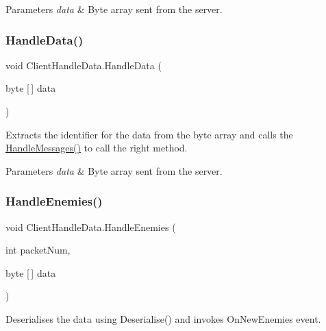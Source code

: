 \begin{DoxyParams}{Parameters}
{\em data} & Byte array sent from the server.\\
\hline
\end{DoxyParams}
\mbox{\label{class_client_handle_data_a42e1bc45eb24e69881b07c1c128252fc}} 
\subsubsection{\texorpdfstring{HandleData()}{HandleData()}}
{\footnotesize\ttfamily void Client\+Handle\+Data.\+Handle\+Data (\begin{DoxyParamCaption}\item[{byte \mbox{[}$\,$\mbox{]}}]{data }\end{DoxyParamCaption})}



Extracts the identifier for the data from the byte array and calls the \mbox{\hyperlink{class_client_handle_data_a2b973713df73e2e1bd53c70557fdcd34}{Handle\+Messages()}} to call the right method. 


\begin{DoxyParams}{Parameters}
{\em data} & Byte array sent from the server.\\
\hline
\end{DoxyParams}
\mbox{\label{class_client_handle_data_a82bf56e38f140f42f31cc54b77e6719a}} 
\subsubsection{\texorpdfstring{HandleEnemies()}{HandleEnemies()}}
{\footnotesize\ttfamily void Client\+Handle\+Data.\+Handle\+Enemies (\begin{DoxyParamCaption}\item[{int}]{packet\+Num,  }\item[{byte \mbox{[}$\,$\mbox{]}}]{data }\end{DoxyParamCaption})\hspace{0.3cm}{\ttfamily [private]}}



Deserialises the data using Deserialise() and invokes On\+New\+Enemies event. 


